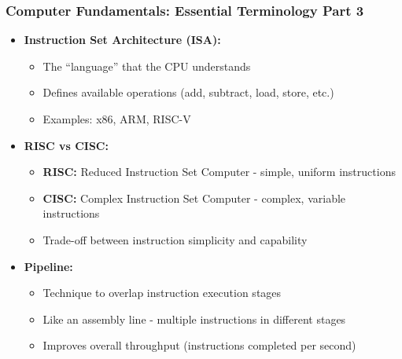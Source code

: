 \begin{frame}
\frametitle{Computer Fundamentals: Essential Terminology Part 3}
\begin{itemize}
    \item \textbf{Instruction Set Architecture (ISA):}
    \begin{itemize}
        \item The ``language'' that the CPU understands
        \item Defines available operations (add, subtract, load, store, etc.)
        \item Examples: x86, ARM, RISC-V
    \end{itemize}
    \item \textbf{RISC vs CISC:}
    \begin{itemize}
        \item \textbf{RISC:} Reduced Instruction Set Computer - simple, uniform instructions
        \item \textbf{CISC:} Complex Instruction Set Computer - complex, variable instructions
        \item Trade-off between instruction simplicity and capability
    \end{itemize}
    \item \textbf{Pipeline:}
    \begin{itemize}
        \item Technique to overlap instruction execution stages
        \item Like an assembly line - multiple instructions in different stages
        \item Improves overall throughput (instructions completed per second)
    \end{itemize}
\end{itemize}
\end{frame}

